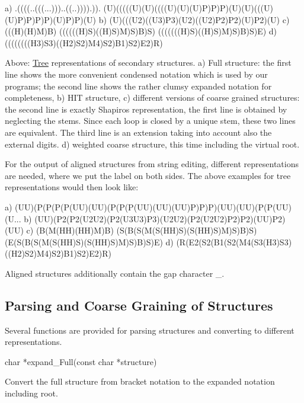 \begin{DoxyVerb}a) .((((..(((...)))..((..)))).)).
   (U)(((((U)(U)((((U)(U)(U)P)P)P)(U)(U)(((U)(U)P)P)P)P)(U)P)P)(U)
b) (U)(((U2)((U3)P3)(U2)((U2)P2)P2)(U)P2)(U)
c) (((H)(H)M)B)
   ((((((H)S)((H)S)M)S)B)S)
   (((((((H)S)((H)S)M)S)B)S)E)
d) ((((((((H3)S3)((H2)S2)M4)S2)B1)S2)E2)R)
\end{DoxyVerb}


Above\+: \mbox{\hyperlink{structTree}{Tree}} representations of secondary structures. a) Full structure\+: the first line shows the more convenient condensed notation which is used by our programs; the second line shows the rather clumsy expanded notation for completeness, b) H\+IT structure, c) different versions of coarse grained structures\+: the second line is exactly Shapiro\textquotesingle{}s representation, the first line is obtained by neglecting the stems. Since each loop is closed by a unique stem, these two lines are equivalent. The third line is an extension taking into account also the external digits. d) weighted coarse structure, this time including the virtual root.

For the output of aligned structures from string editing, different representations are needed, where we put the label on both sides. The above examples for tree representations would then look like\+:

\begin{DoxyVerb}a) (UU)(P(P(P(P(UU)(UU)(P(P(P(UU)(UU)(UU)P)P)P)(UU)(UU)(P(P(UU)(U...
b) (UU)(P2(P2(U2U2)(P2(U3U3)P3)(U2U2)(P2(U2U2)P2)P2)(UU)P2)(UU)
c) (B(M(HH)(HH)M)B)
   (S(B(S(M(S(HH)S)(S(HH)S)M)S)B)S)
   (E(S(B(S(M(S(HH)S)(S(HH)S)M)S)B)S)E)
d) (R(E2(S2(B1(S2(M4(S3(H3)S3)((H2)S2)M4)S2)B1)S2)E2)R)
\end{DoxyVerb}


Aligned structures additionally contain the gap character \textquotesingle{}\+\_\+\textquotesingle{}.

\subsection*{Parsing and Coarse Graining of Structures}

Several functions are provided for parsing structures and converting to different representations.

\begin{DoxyVerb}char  *expand_Full(const char *structure)
\end{DoxyVerb}
 Convert the full structure from bracket notation to the expanded notation including root.

